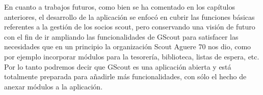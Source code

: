 En cuanto a trabajos futuros, como bien se ha comentado en los capítulos anteriores, el desarrollo de la aplicación se enfocó en cubrir las funciones básicas
referentes a la gestión de los socios scout, pero conservando una visión de futuro con el fin de ir ampliando las funcionalidades de GScout
para satisfacer las necesidades que en un principio la organización Scout Aguere 70 nos dio, como por ejemplo incorporar módulos para la tesorería, biblioteca, listas de espera, etc.\\

Por lo tanto podremos decir que GScout es una aplicación abierta y está totalmente preparada para añadirle más funcionalidades, con sólo el hecho de anexar
módulos a la aplicación.
